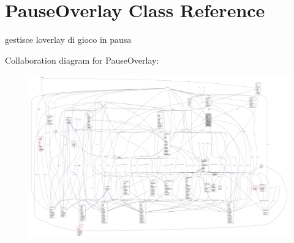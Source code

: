 \hypertarget{classui_1_1_pause_overlay}{}\section{Pause\+Overlay Class Reference}
\label{classui_1_1_pause_overlay}


gestisce l\textquotesingle{}overlay di gioco in pausa  




Collaboration diagram for Pause\+Overlay\+:
\nopagebreak
\begin{figure}[H]
\begin{center}
\leavevmode
\includegraphics[width=350pt]{classui_1_1_pause_overlay__coll__graph}
\end{center}
\end{figure}
